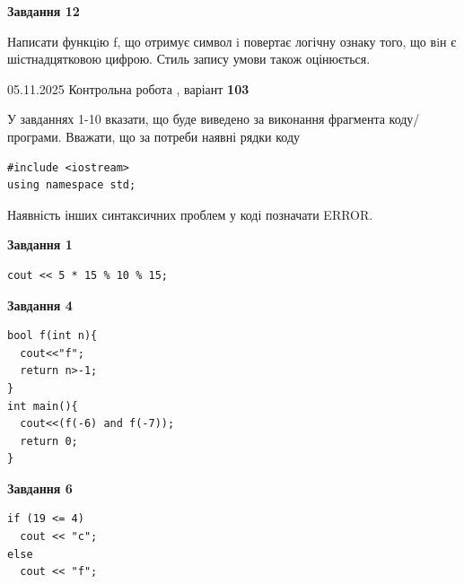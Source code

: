 \documentclass[12pt, ukrainian]{article}
\begin{document}
{\begin {large}
\begin{minipage}[t]{11.0cm}
\begin{center}
\textbf{Завдання 12}
\end{center}

Написати функцiю f, що отримує символ i повертає логічну ознаку того, що вiн є шістнадцятковою цифрою. Стиль запису умови також оцінюється.\par

\end{minipage}

\end {large}}
\newpage

{\Large{05.11.2025 Контрольна робота , варіант  \No \textbf { 103 }\par}}
{
\begin {large}
У завданнях 1-10 вказати, що буде виведено за виконання фрагмента коду/про\-гра\-ми.
Вважати, що за потреби наявні рядки коду
\begin{verbatim}
#include <iostream>
using namespace std;
\end{verbatim}
Наявність інших синтаксичних проблем у коді позначати ERROR.

\begin{minipage}[t]{7.0cm}

\begin{center}
\textbf{Завдання 1}
\end{center}
\vspace{-8mm}

\begin{verbatim}
cout << 5 * 15 % 10 % 15;
\end{verbatim}



\begin{center}
\textbf{Завдання 4}
\end{center}
\vspace{-8mm}

\begin{verbatim}
bool f(int n){
  cout<<"f";
  return n>-1;
}
int main(){
  cout<<(f(-6) and f(-7));
  return 0;
}
\end{verbatim}



\begin{center}
\textbf{Завдання 6}
\end{center}
\vspace{-8mm}

\begin{verbatim}
if (19 <= 4)
  cout << "c";
else
  cout << "f";
\end{verbatim}




\end{minipage}
\end{large}}
\end{document}
